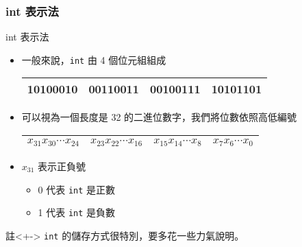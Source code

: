 \documentclass[utf8]{beamer}
\begin{document}
\begin{CJK}{UTF8}{bkai}
\begin{frame}[fragile]
  \frametitle{int 表示法}
  \begin{alertblock}{int 表示法}
    \begin{itemize}[<+->]
    \item 一般來說，\lstinline{int}{} 由 4 個位元組組成
      \begin{table}[h]
      \begin{tabular}{|c|c|c|c|}
      \hline
      10100010 & 00110011 & 00100111 & 10101101\\
      \hline
      \end{tabular}
      \end{table}
    \item 可以視為一個長度是 32 的二進位數字，我們將位數依照高低編號
      \begin{table}[h]
      \begin{tabular}{|c|c|c|c|}
      \hline
      $x_{31}x_{30}\cdots{x_{24}}$ & $x_{23}x_{22}\cdots{x_{16}}$ & $x_{15}x_{14}\cdots{x_{8}}$ & $x_{7}x_{6}\cdots{x_{0}}$\\
      \hline
      \end{tabular}
      \end{table}
    \item $x_{31}$ 表示正負號
      \begin{itemize}[<+->]
      \item 0 代表 \lstinline{int}{} 是正數
      \item 1 代表 \lstinline{int}{} 是負數
      \end{itemize}
    \end{itemize}
  \end{alertblock}
  \begin{exampleblock}{註}<+->
  \lstinline{int}{} 的儲存方式很特別，要多花一些力氣說明。
  \end{exampleblock}
\end{frame}


\end{CJK}
\end{document}
